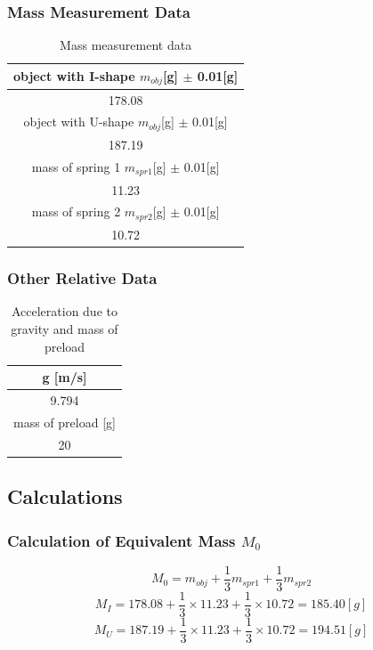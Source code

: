 \documentclass[12pt]{article}
\begin{document}
\subsubsection{Mass Measurement Data}
\begin{table}[H]
\centering
\begin{tabular}{|c|}
\hline
object with I-shape $m_{obj}${[}g{]} $\pm$ 0.01{[}g{]} \\ \hline
178.08                                   \\ \hline
object with U-shape $m_{obj}${[}g{]} $\pm$ 0.01{[}g{]} \\ \hline
187.19                                   \\ \hline
mass of spring 1 $m_{spr1}${[}g{]} $\pm$ 0.01{[}g{]}    \\ \hline
11.23                                    \\ \hline
mass of spring 2 $m_{spr2}${[}g{]} $\pm$ 0.01{[}g{]}    \\ \hline
10.72                                    \\ \hline
\end{tabular}
\caption{Mass measurement data}
\end{table}
\subsubsection{Other Relative Data}
\begin{table}[H]
\centering
\begin{tabular}{|c|}
\hline
g {[}m/s{]}             \\ \hline
9.794                   \\ \hline
mass of preload {[}g{]} \\ \hline
20                      \\ \hline
\end{tabular}
\caption{Acceleration due to gravity and mass of preload}
\end{table}
\subsection{Calculations}
\subsubsection{Calculation of Equivalent Mass $M_0$}
$$M_0=m_{obj}+\frac{1}{3}m_{spr1}+\frac{1}{3}m_{spr2}$$
$$M_I=178.08+\frac{1}{3}\times11.23+\frac{1}{3}\times10.72=185.40[g]$$
$$M_U=187.19+\frac{1}{3}\times11.23+\frac{1}{3}\times10.72=194.51[g]$$
\end{document}
